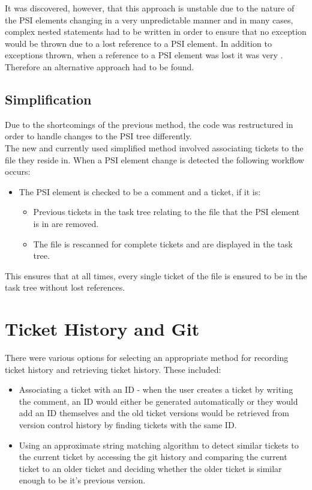 \documentclass{4thYearProject}
\begin{document}
It was discovered, however, that this approach is unstable due to the nature of the PSI elements changing in a very unpredictable manner and in many cases, complex nested statements had to be written in order to ensure that no exception would be thrown due to a lost reference to a PSI element. In addition to exceptions thrown, when a reference to a PSI element was lost it was very . Therefore an alternative approach had to be found.

\subsection{Simplification}

Due to the shortcomings of the previous method, the code was restructured in order to handle changes to the PSI tree differently. \\
The new and currently used simplified method involved associating tickets to the file they reside in. When a PSI element change is detected the following workflow occurs:

\begin{itemize}
\item The PSI element is checked to be a comment and a ticket, if it is:
\begin{itemize}
\item Previous tickets in the task tree relating to the file that the PSI element is in are removed.
\item The file is rescanned for complete tickets and are displayed in the task tree. 
\end{itemize}
\end{itemize}

This ensures that at all times, every single ticket of the file is ensured to be in the task tree without lost references.

\section{Ticket History and Git}

There were various options for selecting an appropriate method for recording ticket history and retrieving ticket history. These included:

\begin{itemize}
\item Associating a ticket with an ID - when the user creates a ticket by writing the comment, an ID would either be generated automatically or they would add an ID themselves and the old ticket versions would be retrieved from version control history by finding tickets with the same ID.
\item Using an approximate string matching algorithm to detect similar tickets to the current ticket by accessing the git history and comparing the current ticket to an older ticket and deciding whether the older ticket is similar enough to be it's previous version. 
\end{itemize}
\end{document}
